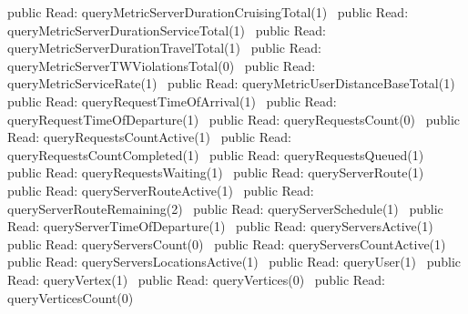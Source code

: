 public \LA{}Read: queryMetricServerDurationCruisingTotal(1)~{\nwtagstyle{}}\RA{}
public \LA{}Read: queryMetricServerDurationServiceTotal(1)~{\nwtagstyle{}}\RA{}
public \LA{}Read: queryMetricServerDurationTravelTotal(1)~{\nwtagstyle{}}\RA{}
public \LA{}Read: queryMetricServerTWViolationsTotal(0)~{\nwtagstyle{}}\RA{}
public \LA{}Read: queryMetricServiceRate(1)~{\nwtagstyle{}}\RA{}
public \LA{}Read: queryMetricUserDistanceBaseTotal(1)~{\nwtagstyle{}}\RA{}
public \LA{}Read: queryRequestTimeOfArrival(1)~{\nwtagstyle{}}\RA{}
public \LA{}Read: queryRequestTimeOfDeparture(1)~{\nwtagstyle{}}\RA{}
public \LA{}Read: queryRequestsCount(0)~{\nwtagstyle{}}\RA{}
public \LA{}Read: queryRequestsCountActive(1)~{\nwtagstyle{}}\RA{}
public \LA{}Read: queryRequestsCountCompleted(1)~{\nwtagstyle{}}\RA{}
public \LA{}Read: queryRequestsQueued(1)~{\nwtagstyle{}}\RA{}
public \LA{}Read: queryRequestsWaiting(1)~{\nwtagstyle{}}\RA{}
public \LA{}Read: queryServerRoute(1)~{\nwtagstyle{}}\RA{}
public \LA{}Read: queryServerRouteActive(1)~{\nwtagstyle{}}\RA{}
public \LA{}Read: queryServerRouteRemaining(2)~{\nwtagstyle{}}\RA{}
public \LA{}Read: queryServerSchedule(1)~{\nwtagstyle{}}\RA{}
public \LA{}Read: queryServerTimeOfDeparture(1)~{\nwtagstyle{}}\RA{}
public \LA{}Read: queryServersActive(1)~{\nwtagstyle{}}\RA{}
public \LA{}Read: queryServersCount(0)~{\nwtagstyle{}}\RA{}
public \LA{}Read: queryServersCountActive(1)~{\nwtagstyle{}}\RA{}
public \LA{}Read: queryServersLocationsActive(1)~{\nwtagstyle{}}\RA{}
public \LA{}Read: queryUser(1)~{\nwtagstyle{}}\RA{}
public \LA{}Read: queryVertex(1)~{\nwtagstyle{}}\RA{}
public \LA{}Read: queryVertices(0)~{\nwtagstyle{}}\RA{}
public \LA{}Read: queryVerticesCount(0)~{\nwtagstyle{}}\RA{}
\nwendcode{}\nwdocspar
{}
\nwenddocs{}\plusendmoddef
